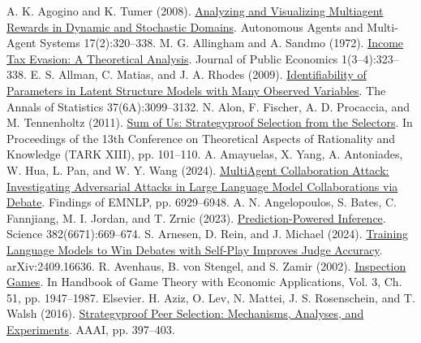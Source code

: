 \begin{thebibliography}{}
\setlength{\itemsep}{2pt}
 A. K. Agogino and K. Tumer (2008). \href{https://doi.org/10.1007/s10458-008-9046-9}{Analyzing and Visualizing Multiagent Rewards in Dynamic and Stochastic Domains}. Autonomous Agents and Multi-Agent Systems 17(2):320--338.
 M. G. Allingham and A. Sandmo (1972). \href{https://doi.org/10.1016/0047-2727(72)90010-2}{Income Tax Evasion: A Theoretical Analysis}. Journal of Public Economics 1(3--4):323--338.
 E. S. Allman, C. Matias, and J. A. Rhodes (2009). \href{https://doi.org/10.1214/09-AOS689}{Identifiability of Parameters in Latent Structure Models with Many Observed Variables}. The Annals of Statistics 37(6A):3099--3132.
 N. Alon, F. Fischer, A. D. Procaccia, and M. Tennenholtz (2011). \href{https://doi.org/10.1145/2000378.2000390}{Sum of Us: Strategyproof Selection from the Selectors}. In Proceedings of the 13th Conference on Theoretical Aspects of Rationality and Knowledge (TARK XIII), pp. 101--110.
 A. Amayuelas, X. Yang, A. Antoniades, W. Hua, L. Pan, and W. Y. Wang (2024). \href{https://arxiv.org/abs/2406.14711}{MultiAgent Collaboration Attack: Investigating Adversarial Attacks in Large Language Model Collaborations via Debate}. Findings of EMNLP, pp. 6929--6948.
 A. N. Angelopoulos, S. Bates, C. Fannjiang, M. I. Jordan, and T. Zrnic (2023). \href{https://doi.org/10.1126/science.adi6000}{Prediction-Powered Inference}. Science 382(6671):669--674.
 S. Arnesen, D. Rein, and J. Michael (2024). \href{https://arxiv.org/abs/2409.16636}{Training Language Models to Win Debates with Self-Play Improves Judge Accuracy}. arXiv:2409.16636.
 R. Avenhaus, B. von Stengel, and S. Zamir (2002). \href{https://doi.org/10.1016/S1574-0005(02)03014-X}{Inspection Games}. In Handbook of Game Theory with Economic Applications, Vol. 3, Ch. 51, pp. 1947--1987. Elsevier.
 H. Aziz, O. Lev, N. Mattei, J. S. Rosenschein, and T. Walsh (2016). \href{https://doi.org/10.1609/aaai.v30i1.10038}{Strategyproof Peer Selection: Mechanisms, Analyses, and Experiments}. AAAI, pp. 397--403.

\end{thebibliography}
